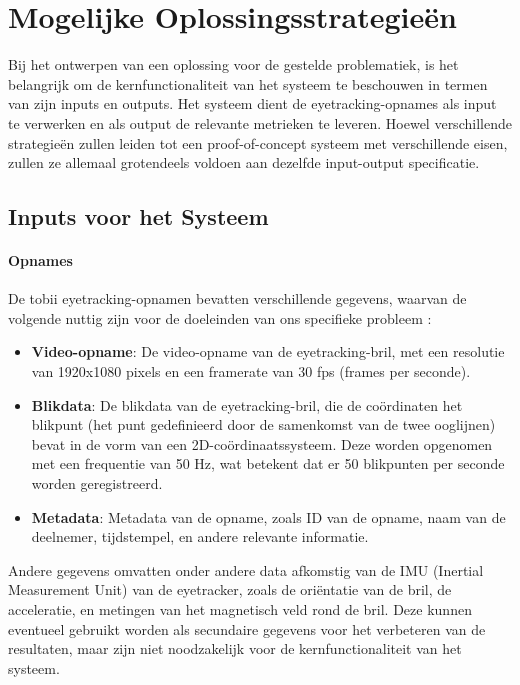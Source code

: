 \chapter{Mogelijke Oplossingsstrategieën}
\label{ch:oplossingsstrategieen}

Bij het ontwerpen van een oplossing voor de gestelde problematiek, is het belangrijk om de 
kernfunctionaliteit van het systeem te beschouwen in termen van zijn inputs en outputs. 
Het systeem dient de eyetracking-opnames als input te verwerken en als output de relevante metrieken te leveren.
Hoewel verschillende strategieën zullen leiden tot een proof-of-concept systeem met verschillende eisen, 
zullen ze allemaal grotendeels voldoen aan dezelfde input-output specificatie.


\section{Inputs voor het Systeem}

\subsubsection{Opnames}

De tobii eyetracking-opnamen bevatten verschillende gegevens, waarvan de volgende nuttig zijn voor de 
doeleinden van ons specifieke probleem \autocite{tobii_developer_guide}:
\begin{itemize}
    \item \textbf{Video-opname}: De video-opname van de eyetracking-bril, met een resolutie van 1920x1080 pixels en een framerate van 30 fps (frames per seconde).
    \item \textbf{Blikdata}: De blikdata van de eyetracking-bril, die de coördinaten het blikpunt 
    (het punt gedefinieerd door de samenkomst van de twee ooglijnen) bevat in de vorm van een 2D-coördinaatssysteem.
    Deze worden opgenomen met een frequentie van 50 Hz, wat betekent dat er 50 blikpunten per seconde worden geregistreerd.
    \item \textbf{Metadata}: Metadata van de opname, zoals ID van de opname, naam van de deelnemer, tijdstempel, en andere relevante informatie.
\end{itemize}

Andere gegevens omvatten onder andere data afkomstig van de IMU (Inertial Measurement Unit) van de eyetracker, 
zoals de oriëntatie van de bril, de acceleratie, en metingen van het magnetisch veld rond de bril.
Deze kunnen eventueel gebruikt worden als secundaire gegevens voor het verbeteren van de resultaten, 
maar zijn niet noodzakelijk voor de kernfunctionaliteit van het systeem.

